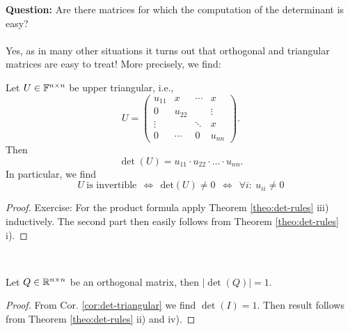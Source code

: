 %
\begin{frame}
	\textbf{Question:} Are there matrices for which the computation of the determinant is easy?\\~\\
 Yes, as in many other situations it turns out that orthogonal and triangular matrices are easy to treat! More precisely, we find:
 ~\\
 \begin{corollary}\label{cor:det-triangular}
 	Let $U \in {\mathbb{F}}^{n\times n}$ be upper triangular, i.e., 
 	$$ U = \begin{pmatrix}
 	u_{11} & x & \cdots & x \\
 	0& u_{22} & & \vdots \\
 	\vdots & & \ddots & x\\
 	0 & \cdots &0 & u_{nn}
 	\end{pmatrix}.$$ Then	
 	$$\det(U) = u_{11} \cdot u_{22} \cdot \hdots \cdot u_{nn}.$$
 		In particular, we find
 	$$
 	U~\text{is invertible}~~\Leftrightarrow~~\text{det}(U)\neq 0~~\Leftrightarrow~~\forall i:~u_{ii}\neq 0
 	$$
 \end{corollary}
 \begin{proof} Exercise:
 	For the product formula apply Theorem \ref{theo:det-rules} iii) inductively. The second part then easily follows from Theorem \ref{theo:det-rules} i).
 \end{proof}



~\\
 \begin{corollary}
 	Let $Q \in {\mathbb{R}}^{n\times n}$ be an orthogonal matrix, then $|\det(Q)| = 1$.
 \end{corollary}
 \begin{proof}
 	From Cor. \ref{cor:det-triangular} we find $\det(I)=1$. Then result follows from Theorem \ref{theo:det-rules} ii) and iv).
 \end{proof} 
\end{frame}

